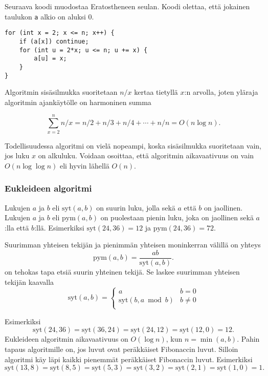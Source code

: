 \noindent
Seuraava koodi muodostaa
Eratostheneen seulan.
Koodi olettaa, että jokainen taulukon \texttt{a}
alkio on aluksi 0.

\begin{lstlisting}
for (int x = 2; x <= n; x++) {
    if (a[x]) continue;
    for (int u = 2*x; u <= n; u += x) {
        a[u] = x;
    }
}
\end{lstlisting}

\noindent
Algoritmin sisäsilmukka suoritetaan
$n/x$ kertaa tietyllä $x$:n arvolla,
joten yläraja algoritmin ajankäytölle
on harmoninen summa


\[\sum_{x=2}^n n/x = n/2 + n/3 + n/4 + \cdots + n/n = O(n \log n).\]

Todellisuudessa algoritmi on vielä nopeampi,
koska sisäsilmukka suoritetaan vain,
jos luku $x$ on alkuluku.
Voidaan osoittaa, että algoritmin aikavaativuus
on vain $O(n \log \log n)$ eli hyvin lähellä $O(n)$.

\subsubsection{Eukleideen algoritmi}


Lukujen $a$ ja $b$  eli $\textrm{syt}(a,b)$
on suurin luku, jolla sekä $a$ että $b$ on jaollinen.
Lukujen $a$ ja $b$  eli $\textrm{pym}(a,b)$
on puolestaan pienin luku, joka on jaollinen sekä $a$:lla että $b$:llä.
Esimerkiksi $\textrm{syt}(24,36)=12$ ja
$\textrm{pym}(24,36)=72$.

Suurimman yhteisen tekijän ja pienimmän yhteisen
moninkerran välillä on yhteys
\[\textrm{pym}(a,b)=\frac{ab}{\textrm{syt}(a,b)}.\]
 on tehokas tapa etsiä
suurin yhteinen tekijä.
Se laskee suurimman yhteisen tekijän kaavalla
\begin{equation*}
    \textrm{syt}(a,b) = \begin{cases}
               a        & b = 0\\
               \textrm{syt}(b,a \bmod b) & b \neq 0\\
           \end{cases}
\end{equation*}

\noindent
Esimerkiksi
\[\textrm{syt}(24,36) = \textrm{syt}(36,24)
= \textrm{syt}(24,12) = \textrm{syt}(12,0)=12.\]
Eukleideen algoritmin aikavaativuus
on $O(\log n)$, kun $n=\min(a,b)$.
Pahin tapaus algoritmille on, jos luvut ovat
peräkkäiset Fibonaccin luvut.
Silloin algoritmi käy läpi kaikki pienemmät
peräkkäiset Fibonaccin luvut.
Esimerkiksi
\[\textrm{syt}(13,8)=\textrm{syt}(8,5)
=\textrm{syt}(5,3)=\textrm{syt}(3,2)=\textrm{syt}(2,1)=\textrm{syt}(1,0)=1.\]

